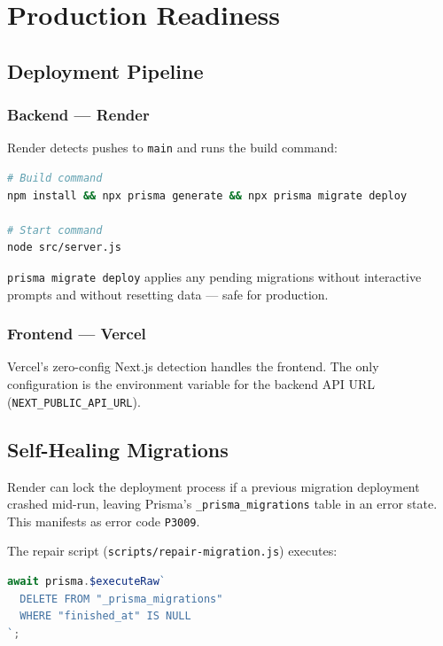 \documentclass[11pt,a4paper,twoside]{book}
\begin{document}
\chapter{Production Readiness}

\section{Deployment Pipeline}

\subsection{Backend — Render}

Render detects pushes to \texttt{main} and runs the build command:

\begin{lstlisting}[language=bash]
# Build command
npm install && npx prisma generate && npx prisma migrate deploy

# Start command
node src/server.js
\end{lstlisting}

\texttt{prisma migrate deploy} applies any pending migrations without
interactive prompts and without resetting data — safe for production.

\subsection{Frontend — Vercel}

Vercel's zero-config Next.js detection handles the frontend.  The only
configuration is the environment variable for the backend API URL
(\texttt{NEXT\_PUBLIC\_API\_URL}).

\section{Self-Healing Migrations}

Render can lock the deployment process if a previous migration deployment
crashed mid-run, leaving Prisma's \texttt{\_prisma\_migrations} table in an
error state.  This manifests as error code \texttt{P3009}.

The repair script (\texttt{scripts/repair-migration.js}) executes:

\begin{lstlisting}[language=JavaScript,caption={P3009 repair script}]
await prisma.$executeRaw`
  DELETE FROM "_prisma_migrations"
  WHERE "finished_at" IS NULL
`;
\end{lstlisting}
\end{document}
